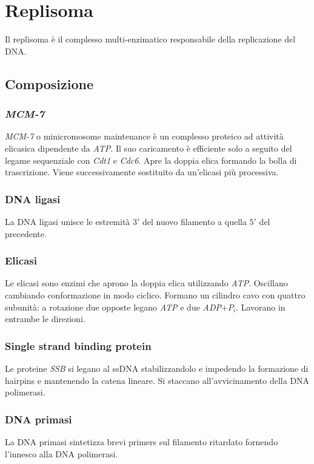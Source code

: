 \section{Replisoma}
Il replisoma \`e il complesso multi-enzimatico responsabile della replicazione del DNA.

	\subsection{Composizione}

		\subsubsection{\emph{MCM-7}}
		\emph{MCM-7} o minicromosome maintenance \`e un complesso proteico ad attivit\`a elicasica dipendente da \emph{ATP}.
		Il suo caricamento \`e efficiente solo a seguito del legame sequenziale con \emph{Cdt1} e \emph{Cdc6}.
		Apre la doppia elica formando la bolla di trascrizione.
		Viene successivamente sostituito da un'elicasi pi\`u processiva.

		\subsubsection{DNA ligasi}
		La DNA ligasi unisce le estremit\`a $3'$ del nuovo filamento a quella $5'$ del precedente.

		\subsubsection{Elicasi}
		Le elicasi sono enzimi che aprono la doppia elica utilizzando \emph{ATP}.
		Oscillano cambiando conformazione in modo ciclico.
		Formano un cilindro cavo con quattro subunit\`a: a rotazione due opposte legano \emph{ATP} e due \emph{ADP$+P_i$}.
		Lavorano in entrambe le direzioni.

		\subsubsection{Single strand binding protein}
		Le proteine \emph{SSB} si legano al ssDNA stabilizzandolo e impedendo la formazione di hairpins e mantenendo la catena lineare.
		Si staccano all'avvicinamento della DNA polimerasi.

		\subsubsection{DNA primasi}
		La DNA primasi sintetizza brevi primers sul filamento ritardato fornendo l'innesco alla DNA polimerasi.

